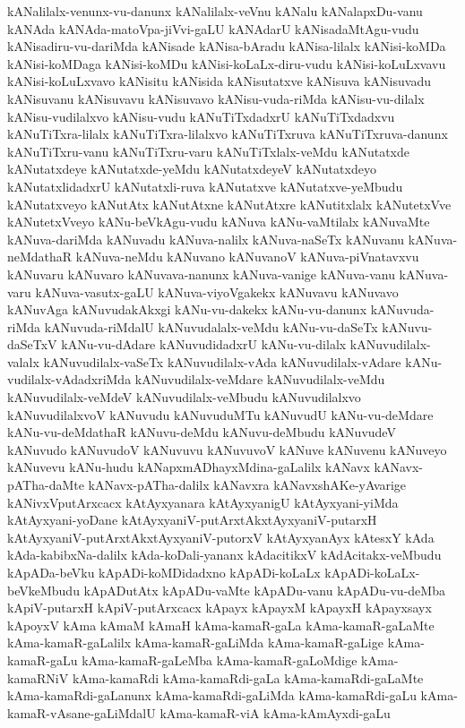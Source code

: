 {kANalilalx-venunx-vu-danunx
kANalilalx-veVnu
kANalu
kANalapxDu-vanu
kANAda
kANAda-matoVpa-jiVvi-gaLU
kANAdarU
kANisadaMtAgu-vudu
kANisadiru-vu-dariMda
kANisade
kANisa-bAradu
kANisa-lilalx
kANisi-koMDa
kANisi-koMDaga
kANisi-koMDu
kANisi-koLaLx-diru-vudu
kANisi-koLuLxvavu
kANisi-koLuLxvavo
kANisitu
kANisida
kANisutatxve
kANisuva
kANisuvadu
kANisuvanu
kANisuvavu
kANisuvavo
kANisu-vuda-riMda
kANisu-vu-dilalx
kANisu-vudilalxvo
kANisu-vudu
kANuTiTxdadxrU
kANuTiTxdadxvu
kANuTiTxra-lilalx
kANuTiTxra-lilalxvo
kANuTiTxruva
kANuTiTxruva-danunx
kANuTiTxru-vanu
kANuTiTxru-varu
kANuTiTxlalx-veMdu
kANutatxde
kANutatxdeye
kANutatxde-yeMdu
kANutatxdeyeV
kANutatxdeyo
kANutatxlidadxrU
kANutatxli-ruva
kANutatxve
kANutatxve-yeMbudu
kANutatxveyo
kANutAtx
kANutAtxne
kANutAtxre
kANutitxlalx
kANutetxVve
kANutetxVveyo
kANu-beVkAgu-vudu
kANuva
kANu-vaMtilalx
kANuvaMte
kANuva-dariMda
kANuvadu
kANuva-nalilx
kANuva-naSeTx
kANuvanu
kANuva-neMdathaR
kANuva-neMdu
kANuvano
kANuvanoV
kANuva-piVnatavxvu
kANuvaru
kANuvaro
kANuvava-nanunx
kANuva-vanige
kANuva-vanu
kANuva-varu
kANuva-vasutx-gaLU
kANuva-viyoVgakekx
kANuvavu
kANuvavo
kANuvAga
kANuvudakAkxgi
kANu-vu-dakekx
kANu-vu-danunx
kANuvuda-riMda
kANuvuda-riMdalU
kANuvudalalx-veMdu
kANu-vu-daSeTx
kANuvu-daSeTxV
kANu-vu-dAdare
kANuvudidadxrU
kANu-vu-dilalx
kANuvudilalx-valalx
kANuvudilalx-vaSeTx
kANuvudilalx-vAda
kANuvudilalx-vAdare
kANu-vudilalx-vAdadxriMda
kANuvudilalx-veMdare
kANuvudilalx-veMdu
kANuvudilalx-veMdeV
kANuvudilalx-veMbudu
kANuvudilalxvo
kANuvudilalxvoV
kANuvudu
kANuvuduMTu
kANuvudU
kANu-vu-deMdare
kANu-vu-deMdathaR
kANuvu-deMdu
kANuvu-deMbudu
kANuvudeV
kANuvudo
kANuvudoV
kANuvuvu
kANuvuvoV
kANuve
kANuvenu
kANuveyo
kANuvevu
kANu-hudu
kANapxmADhayxMdina-gaLalilx
kANavx
kANavx-pATha-daMte
kANavx-pATha-dalilx
kANavxra
kANavxshAKe-yAvarige
kANivxVputArxcacx
kAtAyxyanara
kAtAyxyanigU
kAtAyxyani-yiMda
kAtAyxyani-yoDane
kAtAyxyaniV-putArxtAkxtAyxyaniV-putarxH
kAtAyxyaniV-putArxtAkxtAyxyaniV-putorxV
kAtAyxyanAyx
kAtesxY
kAda
kAda-kabibxNa-dalilx
kAda-koDali-yananx
kAdacitikxV
kAdAcitakx-veMbudu
kApADa-beVku
kApADi-koMDidadxno
kApADi-koLaLx
kApADi-koLaLx-beVkeMbudu
kApADutAtx
kApADu-vaMte
kApADu-vanu
kApADu-vu-deMba
kApiV-putarxH
kApiV-putArxcacx
kApayx
kApayxM
kApayxH
kApayxsayx
kApoyxV
kAma
kAmaM
kAmaH
kAma-kamaR-gaLa
kAma-kamaR-gaLaMte
kAma-kamaR-gaLalilx
kAma-kamaR-gaLiMda
kAma-kamaR-gaLige
kAma-kamaR-gaLu
kAma-kamaR-gaLeMba
kAma-kamaR-gaLoMdige
kAma-kamaRNiV
kAma-kamaRdi
kAma-kamaRdi-gaLa
kAma-kamaRdi-gaLaMte
kAma-kamaRdi-gaLanunx
kAma-kamaRdi-gaLiMda
kAma-kamaRdi-gaLu
kAma-kamaR-vAsane-gaLiMdalU
kAma-kamaR-viA
kAma-kAmAyxdi-gaLu
}
